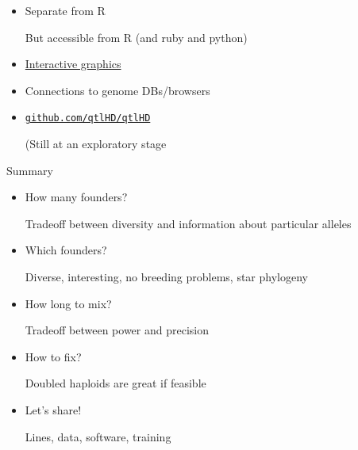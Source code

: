 \documentclass[12pt]{article}
\newcommand{\headsize}{\fontsize{35}{35} \selectfont}
\newcommand{\smallsize}{\fontsize{25}{30} \selectfont}
\newcommand{\smallersize}{\fontsize{20}{25} \selectfont}
\begin{document}
{\begin{minipage}{10in}
\begin{itemize}
\item Separate from R

{\smallersize \color{myblue} But accessible from R (and ruby and python)}

\item \href{http://www.biostat.wisc.edu/~kbroman/D3}{Interactive graphics}

\item Connections to genome DBs/browsers

\item \href{http://github.com/qtlHD/qtlHD}{\tt github.com/qtlHD/qtlHD}

{\smallersize \color{myblue} (Still at an exploratory stage}



\end{itemize}
\end{minipage}


\newpage

\headsize \color{myyellow}
\hfill \begin{minipage}{5.75in}
\centering
Summary
\end{minipage}

\vspace{15mm}

\color{mywhite}
\smallsize

\hfill \begin{minipage}{10in}
\begin{itemize}
\itemsep24pt
\item How many founders?

{\smallersize \color{myblue} Tradeoff between {\color{mypink} diversity} and information about
  {\color{mypink} particular alleles}}

\item Which founders?

{\smallersize \color{myblue} Diverse, interesting, no breeding
  problems, star phylogeny}

\item How long to mix?

{\smallersize \color{myblue} Tradeoff between {\color{mypink} power}
  and {\color{mypink} precision}}

\item How to fix?

{\smallersize \color{myblue} Doubled haploids are great if feasible}

\item Let's share!

{\smallersize \color{myblue} Lines, data, software, training}



\end{itemize}
\end{minipage}}
\end{document}
